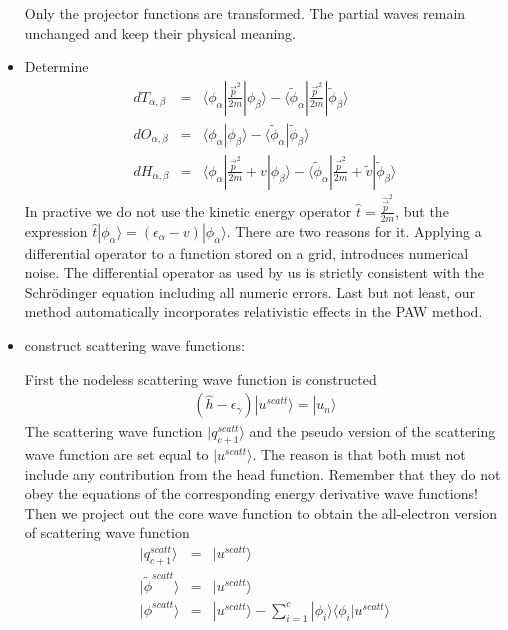 \documentclass[11pt,a4paper]{report}
\begin{document}
\begin{itemize}
Only the projector functions are transformed. The partial waves remain
unchanged and keep their physical meaning.

\item Determine 
\begin{eqnarray*}
dT_{\alpha,\beta}&=&
\langle\phi_\alpha|\frac{\vec{p}^2}{2m}|\phi_\beta\rangle
-\langle\tilde{\phi}_\alpha|\frac{\vec{p}^2}{2m}|\tilde{\phi}_\beta\rangle
\\
dO_{\alpha,\beta}&=&
\langle\phi_\alpha|\phi_\beta\rangle
-\langle\tilde{\phi}_\alpha|\tilde{\phi}_\beta\rangle
\\
dH_{\alpha,\beta}&=&
\langle\phi_\alpha|\frac{\vec{p}^2}{2m}+v|\phi_\beta\rangle
-\langle\tilde{\phi}_\alpha|\frac{\vec{p}^2}{2m}+\tilde{v}|\tilde{\phi}_\beta\rangle
\end{eqnarray*}
In practive we do not use the kinetic energy operator
$\hat{t}=\frac{\hat{\vec{p}}^2}{2m}$, but the expression
$\hat{t}|\phi_\alpha
\rangle=(\epsilon_\alpha-v)|\phi_\alpha\rangle$. There are two reasons
for it. Applying a differential operator to a function stored on a
grid, introduces numerical noise. The differential operator as used by
us is strictly consistent with the Schr\"odinger equation including
all numeric errors. Last but not least, our method automatically
incorporates relativistic effects in the PAW method.
\item construct scattering wave functions:

First the nodeless scattering wave function is constructed
\begin{eqnarray*}
(\hat{h}-\epsilon_\gamma)|u^{scatt}\rangle=|u_n\rangle
\end{eqnarray*}
The scattering wave function $|q^{scatt}_{c+1}\rangle$
and the pseudo version of the scattering wave function are set equal
to $|u^{scatt}\rangle$. The reason is that both must not include any
contribution from the head function. Remember that they do not obey
the equations of the corresponding energy derivative wave functions!
Then we project out the core wave function to obtain the all-electron
version of scattering wave function
\begin{eqnarray*}
|q_{c+1}^{scatt}\rangle&=&|u^{scatt}\rangle
\\
|\tilde{\phi}^{scatt}\rangle&=&|u^{scatt}\rangle
\\
|\phi^{scatt}\rangle&=&|u^{scatt}\rangle-\sum_{i=1}^c |\phi_i\rangle\langle\phi_i|u^{scatt}\rangle
\end{eqnarray*}


\end{itemize}
\end{document}
